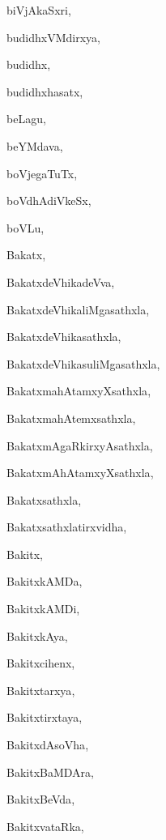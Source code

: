 \begin{multicols}{2}
{biVjAkaSxri}, \pageref{biVjAkaSxri}

{budidhxVMdirxya}, \pageref{budidhxVMdirxya}

{budidhx}, \pageref{budidhx}

{budidhxhasatx}, \pageref{budidhxhasatx}

{beLagu}, \pageref{beLagu}

{beYMdava}, \pageref{beYMdava}

{boVjegaTuTx}, \pageref{boVjegaTuTx}

{boVdhAdiVkeSx}, \pageref{boVdhAdiVkeSx}

{boVLu}, \pageref{boVLu}

{Bakatx}, \pageref{Bakatx}

{BakatxdeVhikadeVva}, \pageref{BakatxdeVhikadeVva}

{BakatxdeVhikaliMgasathxla}, \pageref{BakatxdeVhikaliMgasathxla}

{BakatxdeVhikasathxla}, \pageref{BakatxdeVhikasathxla}

{BakatxdeVhikasuliMgasathxla}, \pageref{BakatxdeVhikasuliMgasathxla}

{BakatxmahAtamxyXsathxla}, \pageref{BakatxmahAtamxyXsathxla}

{BakatxmahAtemxsathxla}, \pageref{BakatxmahAtemxsathxla}

{BakatxmAgaRkirxyAsathxla}, \pageref{BakatxmAgaRkirxyAsathxla}

{BakatxmAhAtamxyXsathxla}, \pageref{BakatxmAhAtamxyXsathxla}

{Bakatxsathxla}, \pageref{Bakatxsathxla}

{Bakatxsathxlatirxvidha}, \pageref{Bakatxsathxlatirxvidha}

{Bakitx}, \pageref{Bakitx}

{BakitxkAMDa}, \pageref{BakitxkAMDa}

{BakitxkAMDi}, \pageref{BakitxkAMDi}

{BakitxkAya}, \pageref{BakitxkAya}

{Bakitxcihenx}, \pageref{Bakitxcihenx}

{Bakitxtarxya}, \pageref{Bakitxtarxya}

{Bakitxtirxtaya}, \pageref{Bakitxtirxtaya}

{BakitxdAsoVha}, \pageref{BakitxdAsoVha}

{BakitxBaMDAra}, \pageref{BakitxBaMDAra}

{BakitxBeVda}, \pageref{BakitxBeVda}

{BakitxvataRka}, \pageref{BakitxvataRka}


\end{multicols}
